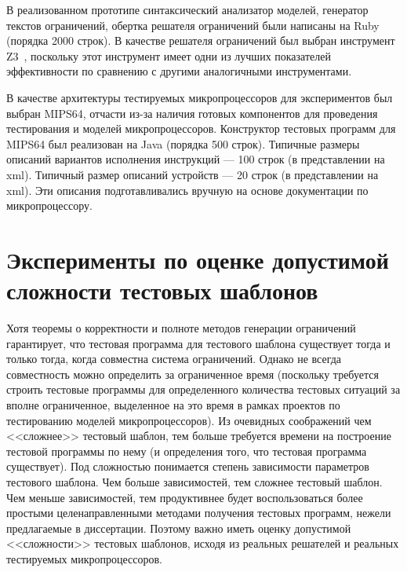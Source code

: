В реализованном прототипе синтаксический анализатор моделей, генератор текстов ограничений, обертка решателя ограничений были написаны на Ruby (порядка 2000 строк). В качестве решателя ограничений был выбран инструмент Z3~\cite{Z3}, поскольку этот инструмент имеет одни из лучших показателей эффективности по сравнению с другими аналогичными инструментами.

В качестве архитектуры тестируемых микропроцессоров для экспериментов был выбран MIPS64, отчасти из-за наличия готовых компонентов для проведения тестирования и моделей микропроцессоров. Конструктор тестовых программ для MIPS64 был реализован на Java (порядка 500 строк). Типичные размеры описаний вариантов исполнения инструкций --- 100 строк (в представлении на xml). Типичный размер описаний устройств --- 20 строк (в представлении на xml). Эти описания подготавливались вручную на основе документации по микропроцессору.

\section{Эксперименты по оценке допустимой сложности тестовых шаблонов}\label{sec:templates_estimation}


Хотя теоремы о корректности и полноте методов генерации ограничений гарантирует, что тестовая программа для тестового шаблона существует тогда и только тогда, когда совместна система ограничений. Однако не всегда совместность можно определить за ограниченное время (поскольку требуется строить тестовые программы для определенного количества тестовых ситуаций за вполне ограниченное, выделенное на это время в рамках проектов по тестированию моделей микропроцессоров). Из очевидных соображений чем <<сложнее>> тестовый шаблон, тем больше требуется времени на построение тестовой программы по нему (и определения того, что тестовая программа существует). Под сложностью понимается степень зависимости параметров тестового шаблона. Чем больше зависимостей, тем сложнее тестовый шаблон. Чем меньше зависимостей, тем продуктивнее будет воспользоваться более простыми целенаправленными методами получения тестовых программ, нежели предлагаемые в диссертации. Поэтому важно иметь оценку допустимой <<сложности>> тестовых шаблонов, исходя из реальных решателей и реальных тестируемых микропроцессоров.

